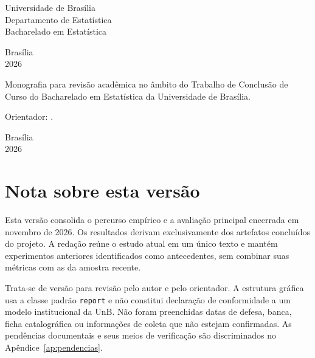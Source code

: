\begin{titlepage}
\centering
{\large Universidade de Brasília\\Departamento de Estatística\\Bacharelado em Estatística\par}
\vspace{2.7cm}
{\large\autorTCC\par}
\vspace{2.3cm}
{\Large\bfseries\tituloTCC\par}
\vfill
{\large Brasília\\2026\par}
\end{titlepage}
\begin{titlepage}
\centering
{\large\autorTCC\par}
\vspace{2.2cm}
{\Large\bfseries\tituloTCC\par}
\vspace{2cm}
\begin{flushright}
\begin{minipage}{0.62\textwidth}
Monografia para revisão acadêmica no âmbito do Trabalho de Conclusão de Curso do Bacharelado em Estatística da Universidade de Brasília.

\vspace{0.7cm}
Orientador: \orientadorTCC.
\end{minipage}
\end{flushright}
\vfill
{Brasília\\2026\par}
\end{titlepage}
\hypersetup{pageanchor=true}
\chapter*{Nota sobre esta versão}
Esta versão consolida o percurso empírico e a avaliação principal encerrada em novembro de 2026. Os resultados derivam exclusivamente dos artefatos concluídos do projeto. A redação reúne o estudo atual em um único texto e mantém experimentos anteriores identificados como antecedentes, sem combinar suas métricas com as da amostra recente.

Trata-se de versão para revisão pelo autor e pelo orientador. A estrutura gráfica usa a classe padrão \texttt{report} e não constitui declaração de conformidade a um modelo institucional da UnB. Não foram preenchidas datas de defesa, banca, ficha catalográfica ou informações de coleta que não estejam confirmadas. As pendências documentais e seus meios de verificação são discriminados no Apêndice~\ref{ap:pendencias}.


